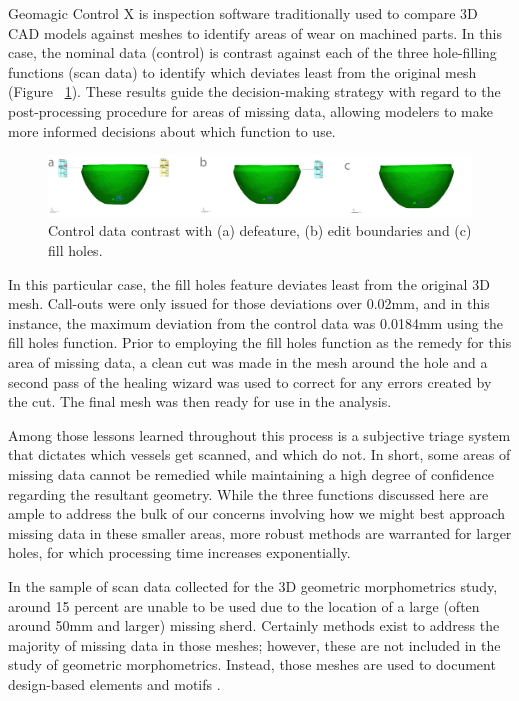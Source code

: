\documentclass[preprint,12pt]{elsarticle}
\begin{document}
Geomagic Control X is inspection software traditionally used to compare 3D CAD models against meshes to identify areas of wear on machined parts. In this case, the nominal data (control) is contrast against each of the three hole-filling functions (scan data) to identify which deviates least from the original mesh (Figure ~\ref{fig:Figure 4}). These results guide the decision-making strategy with regard to the post-processing procedure for areas of missing data, allowing modelers to make more informed decisions about which function to use.

\begin{figure}[ht]\centering
\includegraphics[width=\linewidth]{FigMData}
\caption{Control data contrast with (a) defeature, (b) edit boundaries and (c) fill holes.}
\label{fig:Figure 4}
\end{figure}

In this particular case, the fill holes feature deviates least from the original 3D mesh. Call-outs were only issued for those deviations over 0.02mm, and in this instance, the maximum deviation from the control data was 0.0184mm using the fill holes function. Prior to employing the fill holes function as the remedy for this area of missing data, a clean cut was made in the mesh around the hole and a second pass of the healing wizard was used to correct for any errors created by the cut. The final mesh was then ready for use in the analysis.

Among those lessons learned throughout this process is a subjective triage system that dictates which vessels get scanned, and which do not. In short, some areas of missing data cannot be remedied while maintaining a high degree of confidence regarding the resultant geometry. While the three functions discussed here are ample to address the bulk of our concerns involving how we might best approach missing data in these smaller areas, more robust methods are warranted for larger holes, for which processing time increases exponentially. 

In the sample of scan data collected for the 3D geometric morphometrics study, around 15 percent are unable to be used due to the location of a large (often around 50mm and larger) missing sherd. Certainly methods exist to address the majority of missing data in those meshes; however, these are not included in the study of geometric morphometrics. Instead, those meshes are used to document design-based elements and motifs \citep{Selden:2}.
\end{document}
